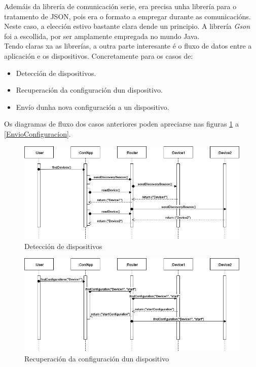    Ademáis da librería de comunicación serie, era precisa unha librería para o
   tratamento de JSON, pois era o formato a empregar durante as
   comunicacións. \\
   
   Neste caso, a elección estivo bastante clara dende un principio. A librería 
   \textit{Gson} \cite{Gson} foi a escollida, por ser amplamente empregada no
   mundo Java. \\
   
   Tendo claras xa as librerías, a outra parte interesante é o fluxo de datos
   entre a aplicación e os dispositivos. Concretamente para os casos de:
   
   \begin{itemize}
    \item Detección de dispositivos.
    \item Recuperación da configuración dun dispositivo.
    \item Envío dunha nova configuración a un dispositivo.
   \end{itemize}
   
   Os diagramas de fluxo dos casos anteriores poden apreciarse nas figuras
   \ref{figura:DeteccionDispositivos} a \ref{EnvioConfiguracion}. \\
   
   \begin{figure}[htbp]
    \centering
    \includegraphics[scale=0.5, keepaspectratio=true]{./imagenes/df-find-devices.png}
    \caption{Detección de dispositivos}
    \label{figura:DeteccionDispositivos}
   \end{figure}
   
   \begin{figure}[htbp]
    \centering
    \includegraphics[scale=0.5, keepaspectratio=true]{./imagenes/df-select-device.png}
    \caption{Recuperación da configuración dun dispositivo}
    \label{figura:RecuperacionConfiguracion}
   \end{figure}
   
